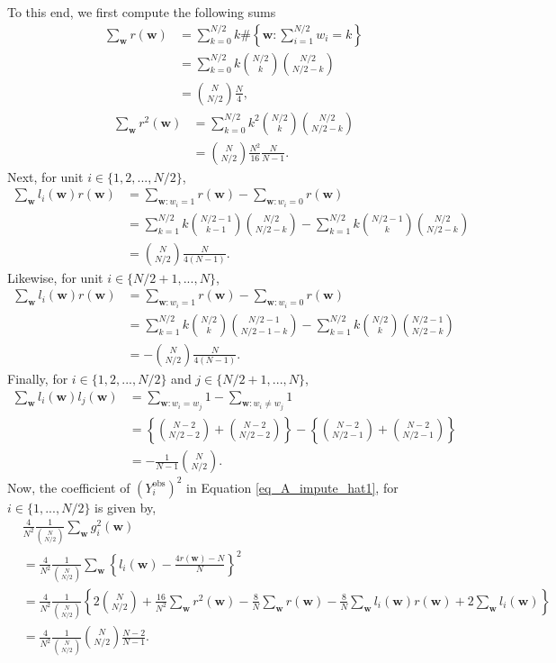 \documentclass[12pt]{article}
\begin{document}
To this end, we first compute the following sums
\begin{align}
    \sum_{\bm{w}}r(\bm{w}) & = \sum_{k = 0}^{N/2} k \#\left\{\bm{w}: \sum_{i=1}^{N/2}w_i = k\right\} \nonumber \\
    & = \sum_{k=0}^{N/2} k \binom{N/2}{k} \binom{N/2}{N/2 - k} \nonumber \\
    & = \binom{N}{N/2} \frac{N}{4},
\end{align}
\begin{align}
    \sum_{\bm{w}}r^2(\bm{w}) & = \sum_{k=0}^{N/2} k^2 \binom{N/2}{k} \binom{N/2}{N/2 - k} \nonumber \\
    & = \binom{N}{N/2}\frac{N^2}{16}\frac{N}{N-1}.
\end{align}
Next, for unit $i \in \{1,2,...,N/2\}$, 
\begin{align}
    \sum_{\bm{w}}l_i(\bm{w})r(\bm{w}) &= \sum_{\bm{w}:w_i = 1} r(\bm{w}) - \sum_{\bm{w}:w_i = 0} r(\bm{w}) \nonumber \\
    & = \sum_{k=1}^{N/2}k \binom{N/2-1}{k-1} \binom{N/2}{N/2-k} - \sum_{k=1}^{N/2}k \binom{N/2-1}{k} \binom{N/2}{N/2-k} \nonumber \\
    & = \binom{N}{N/2}\frac{N}{4(N-1)}.
\end{align}
Likewise, for unit $i \in \{N/2+1,...,N\}$, 
\begin{align}
    \sum_{\bm{w}}l_i(\bm{w})r(\bm{w}) &= \sum_{\bm{w}:w_i = 1} r(\bm{w}) - \sum_{\bm{w}:w_i = 0} r(\bm{w}) \nonumber \\
    & = \sum_{k=1}^{N/2}k \binom{N/2}{k} \binom{N/2-1}{N/2-1-k} - \sum_{k=1}^{N/2}k \binom{N/2}{k} \binom{N/2-1}{N/2-k} \nonumber \\
    & = -\binom{N}{N/2}\frac{N}{4(N-1)}.
\end{align}
Finally, for $i \in \{1,2,...,N/2\}$ and $j \in \{N/2+1,...,N\}$,
\begin{align}
    \sum_{\bm{w}}l_i(\bm{w})l_j(\bm{w}) &= \sum_{\bm{w}:w_i = w_j}1  - \sum_{\bm{w}:w_i \neq w_j}1 \nonumber\\
    & = \left\{\binom{N-2}{N/2-2} + \binom{N-2}{N/2-2} \right\} - \left\{ \binom{N-2}{N/2-1} + \binom{N-2}{N/2-1} \right\} \nonumber \\
    & = -\frac{1}{N-1}\binom{N}{N/2}.
\end{align}
Now, the coefficient of $(Y^{\text{obs}}_i)^2$ in Equation \ref{eq_A_impute_hat1}, for $i \in \{1,...,N/2\}$ is given by,
\begin{align}
    &\frac{4}{N^2}\frac{1}{\binom{N}{N/2}} \sum_{\bm{w}}g^2_i(\bm{w}) \nonumber \\
    & = \frac{4}{N^2}\frac{1}{\binom{N}{N/2}} \sum_{\bm{w}}\left\{l_i(\bm{w}) - \frac{4r(\bm{w})-N}{N}   \right\}^2 \nonumber\\
    & = \frac{4}{N^2}\frac{1}{\binom{N}{N/2}}\left\{2\binom{N}{N/2} + \frac{16}{N^2}\sum_{\bm{w}}r^2(\bm{w}) - \frac{8}{N}\sum_{\bm{w}}r(\bm{w}) - \frac{8}{N}\sum_{\bm{w}}l_i(\bm{w})r(\bm{w}) + 2\sum_{\bm{w}}l_i(\bm{w})\right\} \nonumber \\
    & = \frac{4}{N^2}\frac{1}{\binom{N}{N/2}}\binom{N}{N/2}\frac{N-2}{N-1}.
\end{align}
\end{document}

